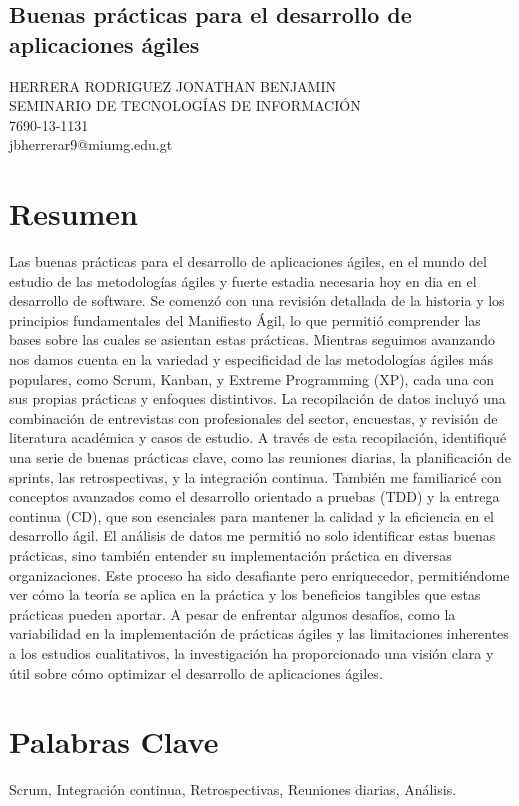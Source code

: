 \documentclass[12pt]{article}
\begin{document}
\begin{center}
\section*{Buenas prácticas para el desarrollo de aplicaciones ágiles}
HERRERA RODRIGUEZ JONATHAN BENJAMIN
\\SEMINARIO DE TECNOLOGÍAS DE INFORMACIÓN
\\7690-13-1131
\\jbherrerar9@miumg.edu.gt
\end{center}
\section{Resumen}

Las buenas prácticas para el desarrollo de aplicaciones ágiles, en el mundo del estudio de las metodologías ágiles y fuerte estadia necesaria hoy en dia en el desarrollo de software. Se comenzó con una revisión detallada de la historia y los principios fundamentales del Manifiesto Ágil, lo que permitió comprender las bases sobre las cuales se asientan estas prácticas. Mientras seguimos avanzando nos damos cuenta en la variedad y especificidad de las metodologías ágiles más populares, como Scrum, Kanban, y Extreme Programming (XP), cada una con sus propias prácticas y enfoques distintivos.
La recopilación de datos incluyó una combinación de entrevistas con profesionales del sector, encuestas, y revisión de literatura académica y casos de estudio. A través de esta recopilación, identifiqué una serie de buenas prácticas clave, como las reuniones diarias, la planificación de sprints, las retrospectivas, y la integración continua. También me familiaricé con conceptos avanzados como el desarrollo orientado a pruebas (TDD) y la entrega continua (CD), que son esenciales para mantener la calidad y la eficiencia en el desarrollo ágil.
El análisis de datos me permitió no solo identificar estas buenas prácticas, sino también entender su implementación práctica en diversas organizaciones. Este proceso ha sido desafiante pero enriquecedor, permitiéndome ver cómo la teoría se aplica en la práctica y los beneficios tangibles que estas prácticas pueden aportar. A pesar de enfrentar algunos desafíos, como la variabilidad en la implementación de prácticas ágiles y las limitaciones inherentes a los estudios cualitativos, la investigación ha proporcionado una visión clara y útil sobre cómo optimizar el desarrollo de aplicaciones ágiles.

\section{Palabras Clave}
Scrum, Integración continua, Retrospectivas, Reuniones diarias, Análisis.
\end{document}
